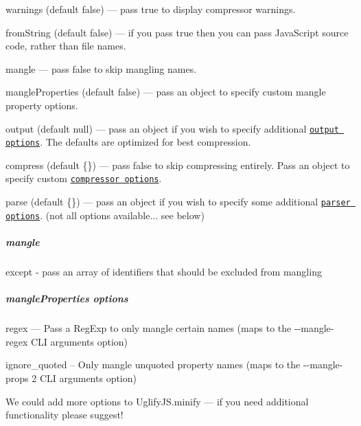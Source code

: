 \begin{DoxyItemize}
\item {\ttfamily warnings} (default {\ttfamily false}) — pass {\ttfamily true} to display compressor warnings.
\item {\ttfamily from\+String} (default {\ttfamily false}) — if you pass {\ttfamily true} then you can pass Java\+Script source code, rather than file names.
\item {\ttfamily mangle} — pass {\ttfamily false} to skip mangling names.
\item {\ttfamily mangle\+Properties} (default {\ttfamily false}) — pass an object to specify custom mangle property options.
\item {\ttfamily output} (default {\ttfamily null}) — pass an object if you wish to specify additional \href{http://lisperator.net/uglifyjs/codegen}{\tt output options}. The defaults are optimized for best compression.
\item {\ttfamily compress} (default {\ttfamily \{\}}) — pass {\ttfamily false} to skip compressing entirely. Pass an object to specify custom \href{http://lisperator.net/uglifyjs/compress}{\tt compressor options}.
\item {\ttfamily parse} (default \{\}) — pass an object if you wish to specify some additional \href{http://lisperator.net/uglifyjs/parser}{\tt parser options}. (not all options available... see below)
\end{DoxyItemize}

\subparagraph*{mangle}


\begin{DoxyItemize}
\item {\ttfamily except} -\/ pass an array of identifiers that should be excluded from mangling
\end{DoxyItemize}

\subparagraph*{mangle\+Properties options}


\begin{DoxyItemize}
\item {\ttfamily regex} — Pass a Reg\+Exp to only mangle certain names (maps to the {\ttfamily -\/-\/mangle-\/regex} C\+LI arguments option)
\item {\ttfamily ignore\+\_\+quoted} – Only mangle unquoted property names (maps to the {\ttfamily -\/-\/mangle-\/props 2} C\+LI arguments option)
\end{DoxyItemize}

We could add more options to {\ttfamily Uglify\+J\+S.\+minify} — if you need additional functionality please suggest!

